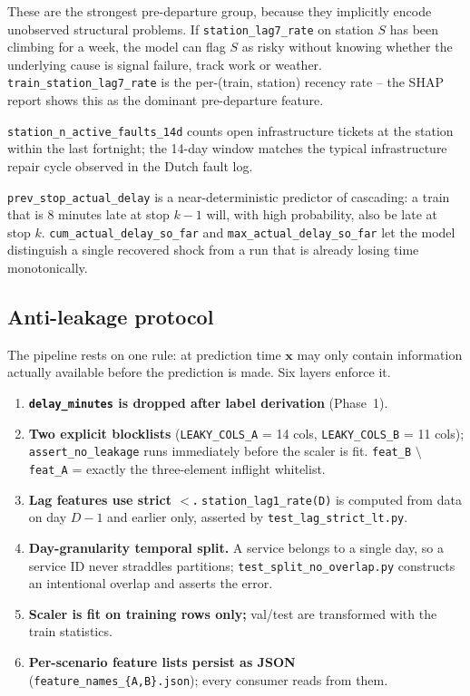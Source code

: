 \begin{description}[leftmargin=2.0em, style=nextline, itemsep=2pt]
    \item[Lag features (7 cols).] These are the strongest pre-departure group, because they implicitly encode unobserved structural problems. If \texttt{station\_lag7\_rate} on station $S$ has been climbing for a week, the model can flag $S$ as risky without knowing whether the underlying cause is signal failure, track work or weather. \texttt{train\_station\_lag7\_rate} is the per-(train, station) recency rate -- the SHAP report shows this as the dominant pre-departure feature.
    \item[Fault context (1 col).] \texttt{station\_n\_active\_faults\_14d} counts open infrastructure tickets at the station within the last fortnight; the 14-day window matches the typical infrastructure repair cycle observed in the Dutch fault log.
    \item[Inflight (3 cols, scenario B only).] \texttt{prev\_stop\_actual\_delay} is a near-deterministic predictor of cascading: a train that is 8 minutes late at stop $k-1$ will, with high probability, also be late at stop $k$. \texttt{cum\_actual\_delay\_so\_far} and \texttt{max\_actual\_delay\_so\_far} let the model distinguish a single recovered shock from a run that is already losing time monotonically.
\end{description}

\subsection{Anti-leakage protocol}

The pipeline rests on one rule: at prediction time $\mathbf{x}$ may only contain information actually available before the prediction is made. Six layers enforce it.
\begin{enumerate}
    \item \textbf{\texttt{delay\_minutes} is dropped after label derivation} (Phase~1).
    \item \textbf{Two explicit blocklists} (\texttt{LEAKY\_COLS\_A} = 14 cols, \texttt{LEAKY\_COLS\_B} = 11 cols); \texttt{assert\_no\_leakage} runs immediately before the scaler is fit. \texttt{feat\_B} $\setminus$ \texttt{feat\_A} = exactly the three-element inflight whitelist.
    \item \textbf{Lag features use strict $<$.} \texttt{station\_lag1\_rate(D)} is computed from data on day $D-1$ and earlier only, asserted by \texttt{test\_lag\_strict\_lt.py}.
    \item \textbf{Day-granularity temporal split.} A service belongs to a single day, so a service ID never straddles partitions; \texttt{test\_split\_no\_overlap.py} constructs an intentional overlap and asserts the error.
    \item \textbf{Scaler is fit on training rows only;} val/test are transformed with the train statistics.
    \item \textbf{Per-scenario feature lists persist as JSON} (\texttt{feature\_names\_\{A,B\}.json}); every consumer reads from them.
\end{enumerate}

